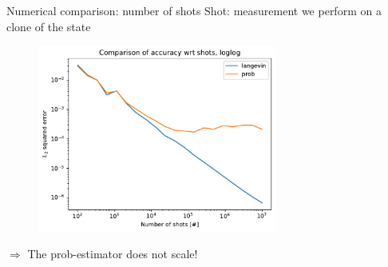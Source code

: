 \documentclass{beamer}
\begin{document}
\begin{frame}{Numerical comparison: number of shots}
    Shot: measurement we perform on a clone of the state
    \begin{figure}[H]

        \centering
        \includegraphics[width=0.7\textwidth]{figures/experiments/shots/shots_acc_comp_shots_exp_loglog-1.png}
    
    
    
    
    
    
    
    
    
    
    
    
        
    
    \end{figure}
    $\Longrightarrow$ The prob-estimator does not scale!
\end{frame}
\end{document}
